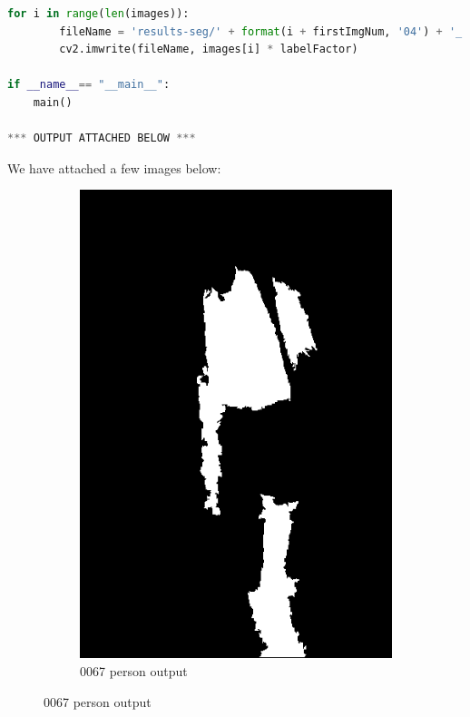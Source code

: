 \documentclass{csc_assignment5}
\begin{document}
\begin{description}
\begin{lstlisting}[language=Python]
    for i in range(len(images)):
        fileName = 'results-seg/' + format(i + firstImgNum, '04') + '_' + segType + '.png'
        cv2.imwrite(fileName, images[i] * labelFactor)

if __name__== "__main__":
    main() 
    
*** OUTPUT ATTACHED BELOW ***
\end{lstlisting}

\newpage
\item[OUTPUT FROM OUR NN:]
We have attached a few images below:
\begin{figure}[h!]
    \centering
    \begin{subfigure}[b]{0.3\textwidth}
        \includegraphics[width=\textwidth]{results-seg/0067_person.png}
        \caption{0067 person output}
    \end{subfigure}

\end{figure}
\end{description}
\end{document}
